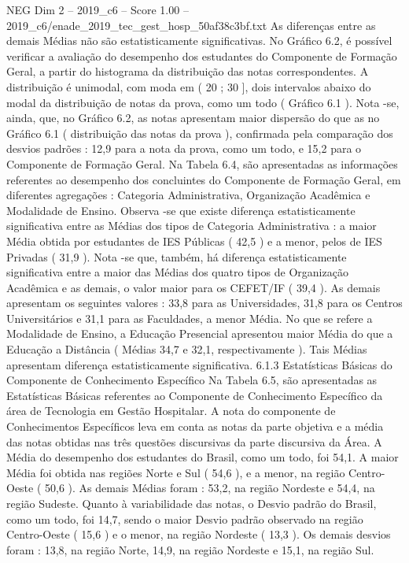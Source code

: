 \begin{textsample}{NEG Dim 2 – 2019\_c6 – Score 1.00 – 2019\_c6/enade\_2019\_tec\_gest\_hosp\_50af38c3bf.txt}
As diferenças entre as demais Médias não são estatisticamente significativas.
No Gráfico 6.2, é possível verificar a avaliação do desempenho dos estudantes do Componente de Formação Geral, a partir do histograma da distribuição das notas correspondentes.
A distribuição é unimodal, com moda em ( 20 ; 30 ], dois intervalos abaixo do modal da distribuição de notas da prova, como um todo ( Gráfico 6.1 ).
Nota -se, ainda, que, no Gráfico 6.2, as notas apresentam maior dispersão do que as no Gráfico 6.1 ( distribuição das notas da prova ), confirmada pela comparação dos desvios padrões : 12,9 para a nota da prova, como um todo, e 15,2 para o Componente de Formação Geral.
Na Tabela 6.4, são apresentadas as informações referentes ao desempenho dos concluintes do Componente de Formação Geral, em diferentes agregações : Categoria Administrativa, Organização Acadêmica e Modalidade de Ensino.
Observa -se que existe diferença estatisticamente significativa entre as Médias dos tipos de Categoria Administrativa : a maior Média obtida por estudantes de IES Públicas ( 42,5 ) e a menor, pelos de IES Privadas ( 31,9 ).
Nota -se que, também, há diferença estatisticamente significativa entre a maior das Médias dos quatro tipos de Organização Acadêmica e as demais, o valor maior para os CEFET/IF ( 39,4 ).
As demais apresentam os seguintes valores : 33,8 para as Universidades, 31,8 para os Centros Universitários e 31,1 para as Faculdades, a menor Média.
No que se refere a Modalidade de Ensino, a Educação Presencial apresentou maior Média do que a Educação a Distância ( Médias 34,7 e 32,1, respectivamente ).
Tais Médias apresentam diferença estatisticamente significativa. 6.1.3 Estatísticas Básicas do Componente de Conhecimento Específico Na Tabela 6.5, são apresentadas as Estatísticas Básicas referentes ao Componente de Conhecimento Específico da área de Tecnologia em Gestão Hospitalar.
A nota do componente de Conhecimentos Específicos leva em conta as notas da parte objetiva e a média das notas obtidas nas três questões discursivas da parte discursiva da Área.
A Média do desempenho dos estudantes do Brasil, como um todo, foi 54,1.
A maior Média foi obtida nas regiões Norte e Sul ( 54,6 ), e a menor, na região Centro-Oeste ( 50,6 ).
As demais Médias foram : 53,2, na região Nordeste e 54,4, na região Sudeste.
Quanto à variabilidade das notas, o Desvio padrão do Brasil, como um todo, foi 14,7, sendo o maior Desvio padrão observado na região Centro-Oeste ( 15,6 ) e o menor, na região Nordeste ( 13,3 ).
Os demais desvios foram : 13,8, na região Norte, 14,9, na região Nordeste e 15,1, na região Sul.

\end{textsample}

